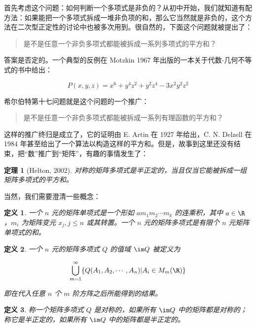\documentclass{ctexbook}
\newtheorem{definition}{定义}[chapter] %
\newtheorem{theorem}{定理}[chapter]
\begin{document}
首先考虑这个问题：如何判断一个多项式是非负的？从初中开始，我们就知道有配方法：如果能把一个多项式拆成一堆非负项的和，那么它当然就是非负的，这个方法在二次型正定性的讨论中也被多次用到。很自然的，下面这个问题就被提出了：

\begin{quote}
\kaishu
是不是任意一个非负多项式都能被拆成一系列多项式的平方和？
\end{quote}

答案是否定的。一个典型的反例在 Motzkin 1967 年出版的一本关于代数-几何不等式的书中给出：

\[
P(x, y, z) = x^6 + y^4z^2 + y^2z^4 -3x^2y^2z^2
\]

希尔伯特第十七问题就是这个问题的一个推广：

\begin{quote}
\kaishu
是不是任意一个非负多项式都能被拆成一系列有理函数的平方和？
\end{quote}

这样的推广终归是成立了，它的证明由 E. Artin 在 1927 年给出，C. N. Delzell 在 1984 年甚至给出了一个算法以构造这样的平方和。但是，故事到这里还没有结束，把“数”推广到“矩阵”，有趣的事情发生了：

\begin{theorem}[Helton, 2002]\label{helton2002}
    对称的矩阵多项式是半正定的，当且仅当它能被拆成一组矩阵多项式的平方和。
\end{theorem}

当然，我们需要澄清一些概念：

\begin{definition}
    一个 $n$ 元的矩阵单项式是一个形如 $am_1m_2 \cdots m_k$ 的连乘积，其中 $a \in \R$，$m_i$ 为矩阵变元 $x_j, j \leqslant n$ 或其转置。一个 $n$ 元的矩阵多项式是有限个 $n$ 元矩阵单项式的和。
\end{definition}

\begin{definition}
    一个 $n$ 元的矩阵多项式 $Q$ 的值域 $\im Q$ 被定义为

    \[
    \bigcup_{m = 1}^\infty\{Q(A_1, A_2, \cdots, A_n) | A_i \in M_m(\R)\}
    \]

    即在代入任意 $n$ 个 $m$ 阶方阵之后所能得到的结果。
\end{definition}

\begin{definition}
    称一个矩阵多项式 $Q$ 是对称的，如果所有 $\im Q$ 中的矩阵都是对称的；称它是半正定的，如果所有 $\im Q$ 中的矩阵都是半正定的。
\end{definition}
\end{document}
